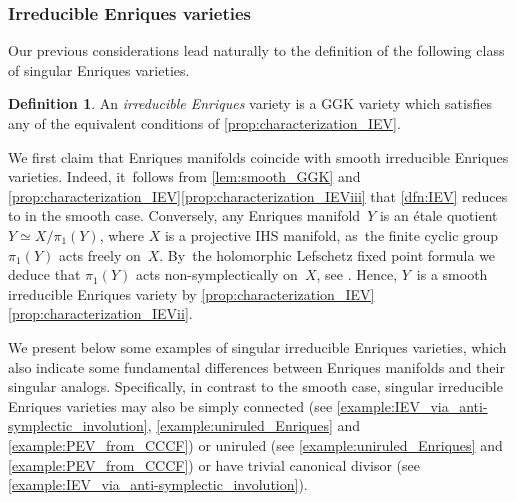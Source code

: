 \documentclass[10pt]{amsart}
\theoremstyle{plain}
\theoremstyle{definition}
\newtheorem{dfn}[thm]{Definition}
\begin{document}
\subsubsection{Irreducible Enriques varieties}

Our previous considerations lead naturally to the definition of the following class of singular Enriques varieties.

\begin{dfn}
\label{dfn:IEV}
An \emph{irreducible Enriques} variety is a GGK variety which satisfies any of the equivalent conditions of \autoref{prop:characterization_IEV}.
\end{dfn}

We first claim that Enriques manifolds coincide with smooth irreducible Enriques varieties. Indeed, it~follows from \autoref{lem:smooth_GGK} and \autoref{prop:characterization_IEV}\eqref{prop:characterization_IEViii} that \autoref{dfn:IEV} reduces to \cite[Def.\,2.1]{OS11a} in the smooth case. Conversely, any Enriques manifold~$Y$ is an étale quotient $Y \simeq X / \pi_1(Y)$, where $X$ is a projective IHS manifold, as~the finite cyclic group $\pi_1(Y)$ acts freely on~$X$. By~the holomorphic Lefschetz fixed point formula we deduce that $\pi_1(Y)$ acts non-symplectically on~$X$, see \cite[\S 2.2]{BNWS11}. Hence, $Y$~is a smooth irreducible Enriques variety by \autoref{prop:characterization_IEV}\eqref{prop:characterization_IEVii}.

We present below some examples of singular irreducible Enriques varieties, which also indicate some fundamental differences between Enriques manifolds and their singular analogs. Specifically, in contrast to the smooth case, singular irreducible Enriques varieties may also be simply connected (see \autoref{example:IEV_via_anti-symplectic_involution}, \autoref{example:uniruled_Enriques} and \autoref{example:PEV_from_CCCF}) or uniruled (see \autoref{example:uniruled_Enriques} and \autoref{example:PEV_from_CCCF}) or have trivial canonical divisor (see \autoref{example:IEV_via_anti-symplectic_involution}).
\end{document}
